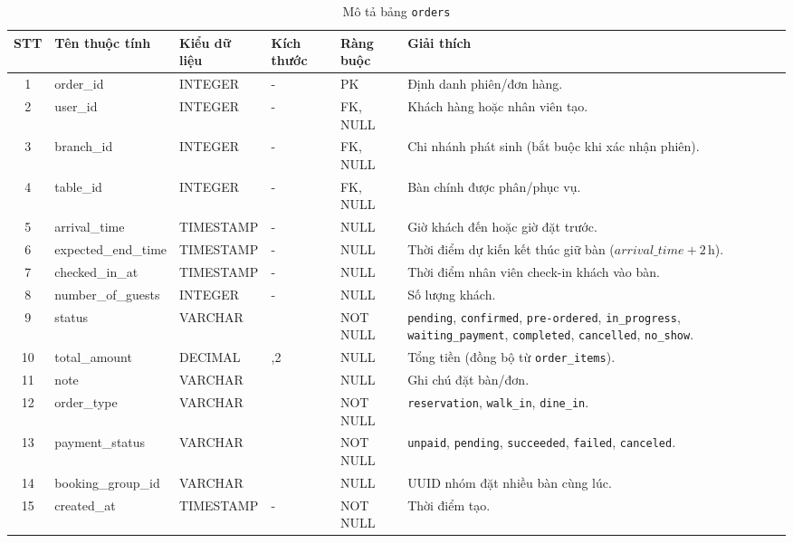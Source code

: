 \documentclass[../DoAn.tex]{subfiles}
\begin{document}
\begin{table}[H]
\centering
\renewcommand{\arraystretch}{1.15}
\footnotesize
\setlength{\tabcolsep}{4pt}
\begin{tabularx}{\textwidth}{|c|>{\RaggedRight\arraybackslash}p{2.9cm}|>{\Centering\arraybackslash}p{2.2cm}|>{\Centering\arraybackslash}p{1.3cm}|>{\Centering\arraybackslash}p{2.2cm}|>{\RaggedRight\arraybackslash}X|}
\hline
\textbf{STT} & \textbf{Tên thuộc tính} & \textbf{Kiểu dữ liệu} & \textbf{Kích thước} & \textbf{Ràng buộc} & \textbf{Giải thích} \\
\hline
1 & order\_id & INTEGER & - & PK & Định danh phiên/đơn hàng. \\ \hline
2 & user\_id & INTEGER & - & FK, NULL & Khách hàng hoặc nhân viên tạo. \\ \hline
3 & branch\_id & INTEGER & - & FK, NULL & Chi nhánh phát sinh (bắt buộc khi xác nhận phiên). \\ \hline
4 & table\_id & INTEGER & - & FK, NULL & Bàn chính được phân/phục vụ. \\ \hline
5 & arrival\_time & TIMESTAMP & - & NULL & Giờ khách đến hoặc giờ đặt trước. \\ \hline
6 & expected\_end\_time & TIMESTAMP & - & NULL & Thời điểm dự kiến kết thúc giữ bàn ($\mathit{arrival\_time}+2\,\mathrm{h}$). \\ \hline
7 & checked\_in\_at & TIMESTAMP & - & NULL & Thời điểm nhân viên check-in khách vào bàn. \\ \hline
8 & number\_of\_guests & INTEGER & - & NULL & Số lượng khách. \\ \hline
9 & status & VARCHAR & 20 & NOT NULL & \texttt{pending}, \texttt{confirmed}, \texttt{pre-ordered}, \texttt{in\_progress}, \texttt{waiting\_payment}, \texttt{completed}, \texttt{cancelled}, \texttt{no\_show}. \\ \hline
10 & total\_amount & DECIMAL & 10,2 & NULL & Tổng tiền (đồng bộ từ \texttt{order\_items}). \\ \hline
11 & note & VARCHAR & 200 & NULL & Ghi chú đặt bàn/đơn. \\ \hline
12 & order\_type & VARCHAR & 15 & NOT NULL & \texttt{reservation}, \texttt{walk\_in}, \texttt{dine\_in}. \\ \hline
13 & payment\_status & VARCHAR & 16 & NOT NULL & \texttt{unpaid}, \texttt{pending}, \texttt{succeeded}, \texttt{failed}, \texttt{canceled}. \\ \hline
14 & booking\_group\_id & VARCHAR & 36 & NULL & UUID nhóm đặt nhiều bàn cùng lúc. \\ \hline
15 & created\_at & TIMESTAMP & - & NOT NULL & Thời điểm tạo. \\ \hline
\end{tabularx}
\caption{Mô tả bảng \texttt{orders}}
\label{tab:orders}
\end{table}
\normalsize
\end{document}
